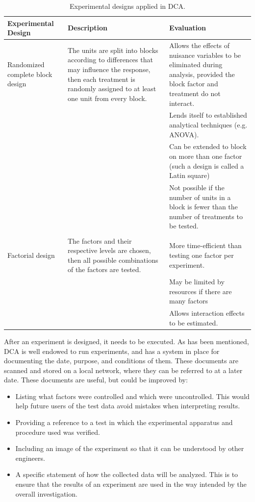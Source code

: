 \documentclass[11pt,a4paper,article]{memoir} %
\begin{document}
\renewcommand\arraystretch{1.5}
\begin{table}[H]
\hspace*{-2.25cm}
\small
\centering
	\begin{tabular}{p{3.5cm} p{6cm} p{6.5cm}}
	\toprule
	\textbf{Experimental Design} 		& 	\textbf{Description}	&	\textbf{Evaluation} \\\toprule
	Randomized complete block design	 & 	The units are split into blocks according to differences that may influence the response, then each treatment is randomly assigned to at least one unit from every block. &  Allows the effects of nuisance variables to be eliminated during analysis, provided the block factor and treatment do not interact. \\
	& & Lends itself to established analytical techniques (e.g. ANOVA). \\
	& & Can be extended to block on more than one factor (such a design is called a Latin square) \\
	& & Not possible if the number of units in a block is fewer than the number of treatments to be tested. \\
	&&\\
	Factorial design & The factors and their respective levels are chosen, then all possible combinations of the factors are tested. & More time-efficient than testing one factor per experiment. \\
	& &  May be limited by resources if there are many factors \\
	& & Allows interaction effects to be estimated.
	\\\bottomrule
	\end{tabular}
	\hspace*{-2.25cm}
	\caption{Experimental designs applied in DCA.}
	\label{tab:exp_designs}
\end{table}

After an experiment is designed, it needs to be executed. As has been mentioned, DCA is well endowed to run experiments, and has a system in place for documenting the date, purpose, and conditions of them. These documents are scanned and stored on a local network, where they can be referred to at a later date. These documents are useful, but could be improved by:
\begin{itemize}
	\item Listing what factors were controlled and which were uncontrolled. This would help future users of the test data avoid mistakes when interpreting results.
	\item Providing a reference to a test in which the experimental apparatus and procedure used was verified.
	\item Including an image of the experiment so that it can be understood by other engineers.
	\item A specific statement of how the collected data will be analyzed. This is to ensure that the results of an experiment are used in the way intended by the overall investigation.
\end{itemize}
\end{document}
